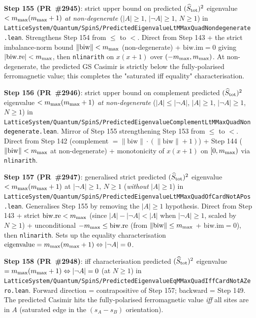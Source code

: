 \documentclass[a4paper,11pt]{article}
\begin{document}
\textbf{Step 155 (PR~\#2945)}: strict upper bound on predicted
$(\widehat S_{\rm tot})^2$ eigenvalue $< m_{\rm max}(m_{\rm max}+1)$
\emph{at non-degenerate} ($|A| \ge 1$, $|\neg A| \ge 1$, $N \ge 1$) in
\texttt{LatticeSystem/Quantum/SpinS/PredictedEigenvalueLtMMaxQuadNondegenerate.lean}.
Strengthens Step 154 from $\le$ to $<$. Direct from Step 143 + the
strict imbalance-norm bound $\|\mathrm{biw}\| < m_{\rm max}$
(non-degenerate) + $\mathrm{biw.im} = 0$ giving
$|\mathrm{biw.re}| < m_{\rm max}$, then \texttt{nlinarith} on
$x(x+1)$ over $(-m_{\rm max}, m_{\rm max})$. At non-degenerate, the
predicted GS Casimir is strictly below the fully-polarised
ferromagnetic value; this completes the "saturated iff equality"
characterisation.

\textbf{Step 156 (PR~\#2946)}: strict upper bound on complement
predicted $(\widehat S_{\rm tot})^2$ eigenvalue
$< m_{\rm max}(m_{\rm max}+1)$ \emph{at non-degenerate}
($|A| \le |\neg A|$, $|A| \ge 1$, $|\neg A| \ge 1$, $N \ge 1$) in
\texttt{LatticeSystem/Quantum/SpinS/PredictedEigenvalueComplementLtMMaxQuadNondegenerate.lean}.
Mirror of Step 155 strengthening Step 153 from $\le$ to $<$. Direct
from Step 142 (complement $= \|\mathrm{biw}\|\cdot(\|\mathrm{biw}\|+1)$)
+ Step 144 ($\|\mathrm{biw}\| < m_{\rm max}$ at non-degenerate) +
monotonicity of $x(x+1)$ on $[0, m_{\rm max})$ via \texttt{nlinarith}.

\textbf{Step 157 (PR~\#2947)}: generalised strict predicted
$(\widehat S_{\rm tot})^2$ eigenvalue $< m_{\rm max}(m_{\rm max}+1)$
at $|\neg A| \ge 1$, $N \ge 1$ (\emph{without} $|A| \ge 1$) in
\texttt{LatticeSystem/Quantum/SpinS/PredictedEigenvalueLtMMaxQuadOfCardNotAPos.lean}.
Generalises Step 155 by removing the $|A| \ge 1$ hypothesis. Direct
from Step 143 + strict $\mathrm{biw.re} < m_{\rm max}$ (since
$|A| - |\neg A| < |\Lambda|$ when $|\neg A| \ge 1$, scaled by
$N \ge 1$) + unconditional $-m_{\rm max} \le \mathrm{biw.re}$ (from
$\|\mathrm{biw}\| \le m_{\rm max}$ + $\mathrm{biw.im} = 0$), then
\texttt{nlinarith}. Sets up the equality characterisation
$\mathrm{eigenvalue} = m_{\rm max}(m_{\rm max}+1) \Leftrightarrow
|\neg A| = 0$.

\textbf{Step 158 (PR~\#2948)}: iff characterisation predicted
$(\widehat S_{\rm tot})^2$ eigenvalue
$= m_{\rm max}(m_{\rm max}+1) \Leftrightarrow |\neg A| = 0$ (at
$N \ge 1$) in
\texttt{LatticeSystem/Quantum/SpinS/PredictedEigenvalueEqMMaxQuadIffCardNotAZero.lean}.
Forward direction = contrapositive of Step 157; backward = Step 149.
The predicted Casimir hits the fully-polarised ferromagnetic value
\emph{iff} all sites are in $A$ (saturated edge in the
$(s_A - s_B)$ orientation).
\end{document}
